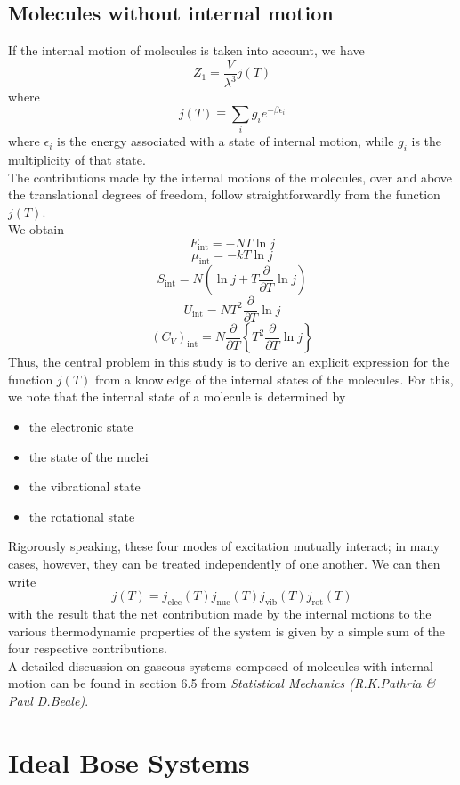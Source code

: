 \subsection{Molecules without internal motion}
If the internal motion of molecules is taken into account, we have
\[Z_1 = \frac{V}{\lambda^3}j(T)\] 
where
\[j(T) \equiv \sum_i g_i e^{-\beta \epsilon_i}\] 
where $\epsilon_i$ is the energy associated with a state of internal motion, while $g_i$ is the multiplicity of that state.
\\
The contributions made by the internal motions of the molecules, over and above the translational degrees of freedom, follow straightforwardly from the function $j(T)$.
\\ 
We obtain
\[F_{\mathrm{int}} = -NT\ln j\] 
\[\mu_{\mathrm{int}} = -kT\ln j\] 
\[S_{\mathrm{int}} = N\left(\ln j + T \frac{\partial}{\partial T}\ln j\right)\] 
\[U_{\mathrm{int}} = NT^2 \frac{\partial}{\partial T}\ln j\] 
\[(C_V)_{\mathrm{int}} = N\frac{\partial}{\partial T} \left\{T^2 \frac{\partial}{\partial T} \ln j \right\} \]
Thus, the central problem in this study is to derive an explicit expression for the function $j(T)$ from a knowledge of the internal states of the molecules. For this, we note that the internal state of a molecule is determined by
\begin{itemize}
\item the electronic state
\item the state of the nuclei
\item the vibrational state
\item the rotational state
\end{itemize}
\indent
Rigorously speaking, these four modes of excitation mutually interact; in many cases, however, they can be treated independently of one another. We can then write
\[j(T) = j_{\mathrm{elec}}(T)j_{\mathrm{nuc}}(T)j_{\mathrm{vib}}(T)j_{\mathrm{rot}}(T)\] 
with the result that the net contribution made by the internal motions to the various thermodynamic properties of the system is given by a simple sum of the four respective contributions.
\\
A detailed discussion on gaseous systems composed of molecules with internal motion can be found in section 6.5 from \emph{Statistical Mechanics (R.K.Pathria \& Paul D.Beale)}.

\section{Ideal Bose Systems}

